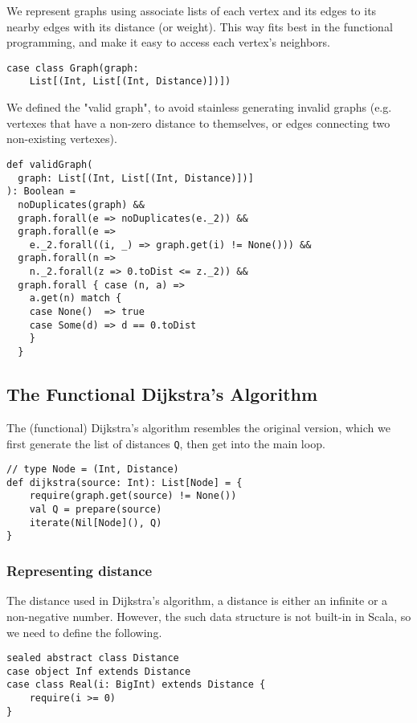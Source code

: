 \documentclass[11pt,a4paper]{article}
\begin{document}
We represent graphs using associate lists of each vertex and 
its edges to its nearby edges with its distance (or weight). This way fits best in the functional programming, and make it easy to access each vertex's neighbors. 

\begin{lstlisting}
case class Graph(graph: 
    List[(Int, List[(Int, Distance)])])
\end{lstlisting}

We defined the "valid graph", to avoid stainless generating invalid
graphs (e.g. vertexes that have a non-zero distance to themselves, or edges connecting two non-existing vertexes). 

\begin{lstlisting}
def validGraph(
  graph: List[(Int, List[(Int, Distance)])]
): Boolean =
  noDuplicates(graph) &&
  graph.forall(e => noDuplicates(e._2)) &&
  graph.forall(e => 
    e._2.forall((i, _) => graph.get(i) != None())) &&
  graph.forall(n => 
    n._2.forall(z => 0.toDist <= z._2)) &&
  graph.forall { case (n, a) =>
    a.get(n) match {
    case None()  => true
    case Some(d) => d == 0.toDist
    }
  }
\end{lstlisting}

\subsection{The Functional Dijkstra's Algorithm}

The (functional) Dijkstra's algorithm resembles the original version,
which we first generate the list of distances \texttt{Q}, then get into
the main loop.

\begin{lstlisting}
// type Node = (Int, Distance)
def dijkstra(source: Int): List[Node] = {
    require(graph.get(source) != None())
    val Q = prepare(source)
    iterate(Nil[Node](), Q)
}
\end{lstlisting}

\subsubsection{Representing distance}

The distance used in Dijkstra's algorithm, a distance is either an infinite or 
a non-negative number. However, the such data structure is not built-in in
Scala, so we need to define the following.


\begin{lstlisting}
sealed abstract class Distance
case object Inf extends Distance
case class Real(i: BigInt) extends Distance { 
    require(i >= 0) 
}
\end{lstlisting}
\end{document}
